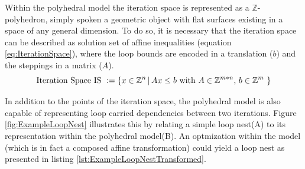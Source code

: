 Within the polyhedral model the iteration space is represented as a $\mathbb{Z}$-polyhedron,
simply spoken a geometric object with flat surfaces existing in a space of 
any general dimension. To do so, it is necessary that the iteration space 
can be described as solution set of affine inequalities
(equation \ref{eq:IterationSpace}), where the loop bounds are encoded in a translation
($b$) and the steppings in a matrix ($A$). 
\begin{equation}
  \text{Iteration Space IS } := \{ x \in \mathbb{Z}^n \, |\, Ax\leq b \text{ with $A\in\mathbb{Z}^{m*n} $, $ b\in\mathbb{Z}^{m}$  } \} \label{eq:IterationSpace}
\end{equation}

In addition to the points of the iteration space, the polyhedral model is also
capable of representing loop carried dependencies between two iterations. 
Figure \ref{fig:ExampleLoopNest} illustrates this by relating a simple loop 
nest({\footnotesize A}) to its representation within the polyhedral 
model({\footnotesize B}). 
An optmization within the model (which is in fact a composed
affine transformation) could yield 
a loop nest as presented in listing \ref{lst:ExampleLoopNestTransformed}. 

